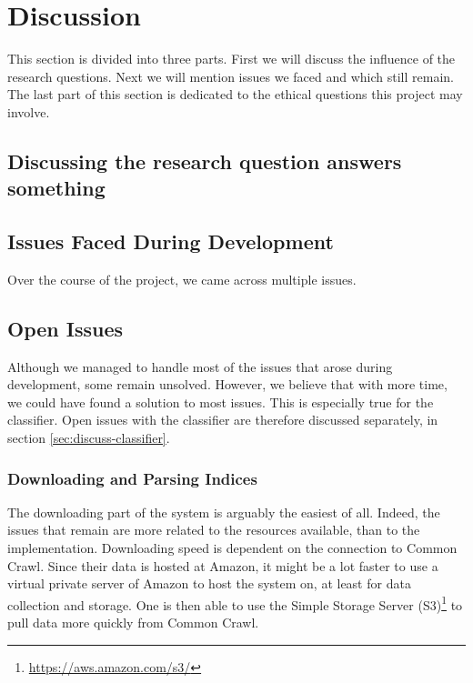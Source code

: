 \chapter{Discussion}

This section is divided into three parts. First we will discuss the influence of the research questions. Next we will mention issues we faced and which still remain. The last part of this section is dedicated to the ethical questions this project may involve.

\section{Discussing the research question answers something} 

\section{Issues Faced During Development}
Over the course of the project, we came across multiple issues. 
    


\section{Open Issues}\label{sec:Discussion - Open Issues}
Although we managed to handle most of the issues that arose during development, some remain unsolved. However, we believe that with more time, we could have found a solution to most issues. This is especially true for the classifier. Open issues with the classifier are therefore discussed separately, in section \ref{sec:discuss-classifier}.

\subsection{Downloading and Parsing Indices}
The downloading part of the system is arguably the easiest of all. Indeed, the issues that remain are more related to the resources available, than to the implementation. Downloading speed is dependent on the connection to Common Crawl. Since their data is hosted at Amazon, it might be a lot faster to use a virtual private server of Amazon to host the system on, at least for data collection and storage. One is then able to use the Simple Storage Server (S3)\footnote{\url{https://aws.amazon.com/s3/}} to pull data more quickly from Common Crawl.

